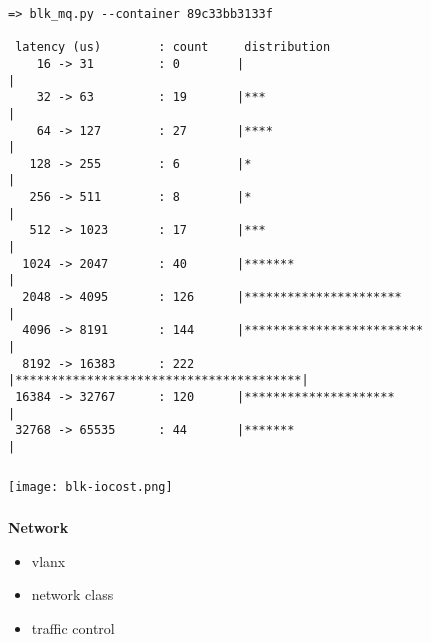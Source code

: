 \documentclass[usenames,dvipsnames, 18pt, compress, aspectratio=169]{beamer}
\begin{document}
\begin{frame}[fragile]{}
    \frametitle{}
    \begin{center}

        \begin{flushleft}
			\begin{verbatim}
=> blk_mq.py --container 89c33bb3133f

 latency (us)        : count     distribution
    16 -> 31         : 0        |                                        |
    32 -> 63         : 19       |***                                     |
    64 -> 127        : 27       |****                                    |
   128 -> 255        : 6        |*                                       |
   256 -> 511        : 8        |*                                       |
   512 -> 1023       : 17       |***                                     |
  1024 -> 2047       : 40       |*******                                 |
  2048 -> 4095       : 126      |**********************                  |
  4096 -> 8191       : 144      |*************************               |
  8192 -> 16383      : 222      |****************************************|
 16384 -> 32767      : 120      |*********************                   |
 32768 -> 65535      : 44       |*******                                 |

        \end{verbatim}
        \end{flushleft}

    \end{center}
\end{frame}

\begin{frame}[fragile]{}
    \frametitle{}
    \begin{center}

        \texttt{[image: blk-iocost.png]}

    \end{center}
\end{frame}

\begin{frame}[fragile]{}
    \frametitle{}
    \begin{center}
        \textbf{Network}

        \begin{itemize}[label={\MVRightarrow}]
			\item vlanx
            \item network class
            \item traffic control
        \end{itemize}

    \end{center}
\end{frame}
\end{document}
